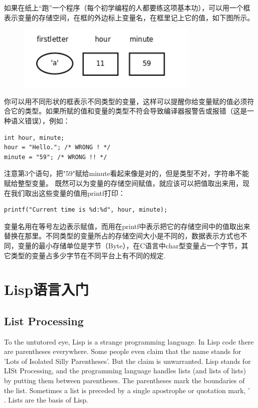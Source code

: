 \documentclass[12pt]{book}
\begin{document}
如果在纸上“跑”一个程序（每个初学编程的人都要练这项基本功），可以用一个框表示变量的存储空间，在框的外边标上变量名，在框里记上它的值，如下图所示。
\begin{figure}[H]
	\centering
	\includegraphics[scale=0.7]{image//C语言入门//常量变量和表达式//1}
\end{figure}
你可以用不同形状的框表示不同类型的变量，这样可以提醒你给变量赋的值必须符合它的类型。如果所赋的值和变量的类型不符会导致编译器报警告或报错（这是一种语义错误），例如：
\begin{verbatim}
int hour, minute;
hour = "Hello."; /* WRONG ! */
minute = "59"; /* WRONG !! */
\end{verbatim}
注意第3个语句，把"59"赋给minute看起来像是对的，但是类型不对，字符串不能赋给整型变量。
既然可以为变量的存储空间赋值，就应该可以把值取出来用，现在我们取出这些变量的值用printf打印：
\begin{verbatim}
printf("Current time is %d:%d", hour, minute);
\end{verbatim}
变量名用在等号左边表示赋值，而用在printf中表示把它的存储空间中的值取出来替换在那里。不同类型的变量所占的存储空间大小是不同的，数据表示方式也不同，变量的最小存储单位是字节（Byte），在C语言中char型变量占一个字节，其它类型的变量占多少字节在不同平台上有不同的规定.


\chapter{Lisp语言入门}

\section{List Processing}
To the untutored eye, Lisp is a strange programming language. In Lisp code there are parentheses everywhere. Some people even claim that the name stands for 'Lots of Isolated Silly Parentheses'. But the claim is unwarranted. Lisp stands for LISt Processing, and the programming language handles lists (and lists of lists) by putting them between parentheses. The parentheses mark the boundaries of the list. Sometimes a list is preceded by a single apostrophe or quotation mark, ' . Lists are the basis of Lisp.
\end{document}
